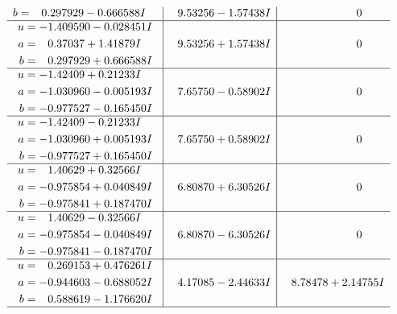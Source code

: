 \documentclass[1p]{elsarticle_modified}
\theoremstyle{definition}
\begin{document}
$$\begin{array}{c|c|c}
\begin{aligned}
b &= \phantom{-}0.297929 - 0.666588 I\end{aligned}
 & \phantom{-}9.53256 - 1.57438 I & \phantom{-0.000000 } 0 \\ \hline\begin{aligned}
u &= -1.409590 - 0.028451 I \\
a &= \phantom{-}0.37037 + 1.41879 I \\
b &= \phantom{-}0.297929 + 0.666588 I\end{aligned}
 & \phantom{-}9.53256 + 1.57438 I & \phantom{-0.000000 } 0 \\ \hline\begin{aligned}
u &= -1.42409 + 0.21233 I \\
a &= -1.030960 - 0.005193 I \\
b &= -0.977527 - 0.165450 I\end{aligned}
 & \phantom{-}7.65750 - 0.58902 I & \phantom{-0.000000 } 0 \\ \hline\begin{aligned}
u &= -1.42409 - 0.21233 I \\
a &= -1.030960 + 0.005193 I \\
b &= -0.977527 + 0.165450 I\end{aligned}
 & \phantom{-}7.65750 + 0.58902 I & \phantom{-0.000000 } 0 \\ \hline\begin{aligned}
u &= \phantom{-}1.40629 + 0.32566 I \\
a &= -0.975854 + 0.040849 I \\
b &= -0.975841 + 0.187470 I\end{aligned}
 & \phantom{-}6.80870 + 6.30526 I & \phantom{-0.000000 } 0 \\ \hline\begin{aligned}
u &= \phantom{-}1.40629 - 0.32566 I \\
a &= -0.975854 - 0.040849 I \\
b &= -0.975841 - 0.187470 I\end{aligned}
 & \phantom{-}6.80870 - 6.30526 I & \phantom{-0.000000 } 0 \\ \hline\begin{aligned}
u &= \phantom{-}0.269153 + 0.476261 I \\
a &= -0.944603 - 0.688052 I \\
b &= \phantom{-}0.588619 - 1.176620 I\end{aligned}
 & \phantom{-}4.17085 - 2.44633 I & \phantom{-}8.78478 + 2.14755 I\\
 \hline 
 \end{array}$$\newpage$$\begin{array}{c|c|c}  

\end{array}$$
\end{document}
